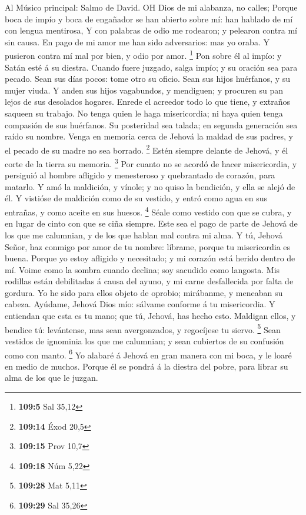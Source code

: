  Al Músico principal: Salmo de David. OH Dios de mi
alabanza, no calles;  Porque boca de impío y boca de
engañador se han abierto sobre mí: han hablado de mí con lengua
mentirosa,  Y con palabras de odio me rodearon; y pelearon
contra mí sin causa.  En pago de mi amor me han sido
adversarios: mas yo oraba.  Y pusieron contra mí mal por
bien, y odio por amor. \footnote{\textbf{109:5} Sal 35,12} 
Pon sobre él al impío: y Satán esté á su diestra.  Cuando
fuere juzgado, salga impío; y su oración sea para pecado. 
Sean sus días pocos: tome otro su oficio.  Sean sus hijos
huérfanos, y su mujer viuda.  Y anden sus hijos vagabundos,
y mendiguen; y procuren su pan lejos de sus desolados hogares.
 Enrede el acreedor todo lo que tiene, y extraños saqueen
su trabajo.  No tenga quien le haga misericordia; ni haya
quien tenga compasión de sus huérfanos.  Su posteridad sea
talada; en segunda generación sea raído su nombre.  Venga
en memoria cerca de Jehová la maldad de sus padres, y el pecado de su
madre no sea borrado. \footnote{\textbf{109:14} Éxod 20,5} 
Estén siempre delante de Jehová, y él corte de la tierra su memoria.
\footnote{\textbf{109:15} Prov 10,7}  Por cuanto no se
acordó de hacer misericordia, y persiguió al hombre afligido y
menesteroso y quebrantado de corazón, para matarlo.  Y amó
la maldición, y vínole; y no quiso la bendición, y ella se alejó de él.
 Y vistióse de maldición como de su vestido, y entró como
agua en sus entrañas, y como aceite en sus huesos. \footnote{\textbf{109:18}
  Núm 5,22}  Séale como vestido con que se cubra, y en
lugar de cinto con que se ciña siempre.  Este sea el pago
de parte de Jehová de los que me calumnian, y de los que hablan mal
contra mi alma.  Y tú, Jehová Señor, haz conmigo por amor
de tu nombre: líbrame, porque tu misericordia es buena. 
Porque yo estoy afligido y necesitado; y mi corazón está herido dentro
de mí.  Voime como la sombra cuando declina; soy sacudido
como langosta.  Mis rodillas están debilitadas á causa del
ayuno, y mi carne desfallecida por falta de gordura.  Yo he
sido para ellos objeto de oprobio; mirábanme, y meneaban su cabeza.
 Ayúdame, Jehová Dios mío: sálvame conforme á tu
misericordia.  Y entiendan que esta es tu mano; que tú,
Jehová, has hecho esto.  Maldigan ellos, y bendice tú:
levántense, mas sean avergonzados, y regocíjese tu siervo. \footnote{\textbf{109:28}
  Mat 5,11}  Sean vestidos de ignominia los que me
calumnian; y sean cubiertos de su confusión como con manto. \footnote{\textbf{109:29}
  Sal 35,26}  Yo alabaré á Jehová en gran manera con mi
boca, y le loaré en medio de muchos.  Porque él se pondrá á
la diestra del pobre, para librar su alma de los que le juzgan.

